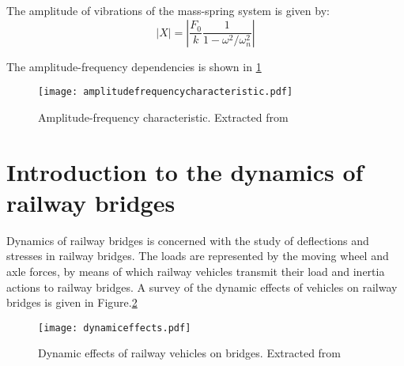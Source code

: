 The amplitude of vibrations of the mass-spring system is given by:
\begin{equation}
	|X|=|\frac{F_0}{k}\frac{1}{1-\omega^2/\omega_n^2}|
\end{equation}

The amplitude-frequency dependencies is shown in \ref{fig:amplitude-frequency-characteristic} 

\begin{figure}[h]
	\centering
	\texttt{[image: amplitudefrequencycharacteristic.pdf]}
	\caption{Amplitude-frequency characteristic. Extracted from \cite[2.2.2]{dynamicslecturenote}}
	\label{fig:amplitude-frequency-characteristic}
\end{figure}


\section{Introduction to the dynamics of railway bridges}

\cite{fryba1996dynamics}Dynamics of railway bridges is concerned with the study of deflections and stresses in railway bridges. The loads are represented by the moving wheel and axle forces, by means of which railway vehicles transmit their load and inertia actions to railway bridges. A survey of the dynamic effects of vehicles on railway bridges is given in Figure.\ref{fig:dynamic effects}

\begin{figure}[h]
	\centering
	\texttt{[image: dynamiceffects.pdf]}
	\caption{Dynamic effects of railway vehicles on bridges. Extracted from \cite[1.1]{fryba1996dynamics} }
	\label{fig:dynamic effects}
\end{figure}

